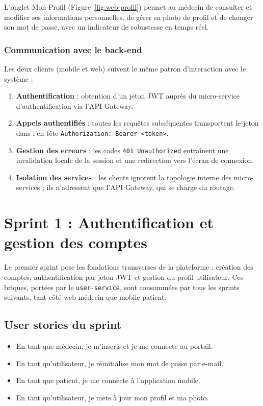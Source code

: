 \documentclass[12pt,a4paper,oneside]{report}
\begin{document}
L'onglet Mon Profil (Figure~\ref{fig:web-profil}) permet au médecin de consulter
et modifier ses informations personnelles, de gérer sa photo de profil et de
changer son mot de passe, avec un indicateur de robustesse en temps réel.

\subsection{Communication avec le back-end}

Les deux clients (mobile et web) suivent le même patron d'interaction avec
le système :

\begin{enumerate}
  \item \textbf{Authentification} : obtention d'un jeton JWT auprès du
    micro-service d'authentification via l'API Gateway.
  \item \textbf{Appels authentifiés} : toutes les requêtes subséquentes
    transportent le jeton dans l'en-tête \texttt{Authorization: Bearer <token>}.
  \item \textbf{Gestion des erreurs} : les codes \texttt{401 Unauthorized}
    entraînent une invalidation locale de la session et une redirection vers
    l'écran de connexion.
  \item \textbf{Isolation des services} : les clients ignorent la topologie
    interne des micro-services ; ils n'adressent que l'API Gateway, qui se
    charge du routage.
\end{enumerate}

\chapter{Sprint 1 : Authentification et gestion des comptes}

Le premier sprint pose les fondations transverses de la plateforme : création
des comptes, authentification par jeton JWT et gestion du profil utilisateur.
Ces briques, portées par le \texttt{user-service}, sont consommées par tous les
sprints suivants, tant côté web médecin que mobile patient.

\section{User stories du sprint}
\begin{itemize}[leftmargin=1.4em]
  \item En tant que médecin, je m'inscris et je me connecte au portail.
  \item En tant qu'utilisateur, je réinitialise mon mot de passe par e-mail.
  \item En tant que patient, je me connecte à l'application mobile.
  \item En tant qu'utilisateur, je mets à jour mon profil et ma photo.
\end{itemize}
\end{document}
